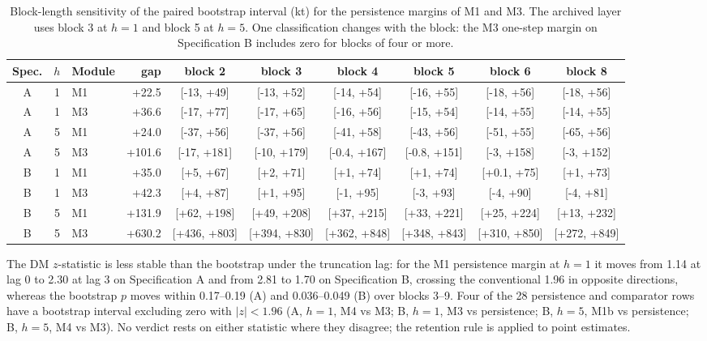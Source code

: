 \documentclass[preprint,11pt,authoryear]{elsarticle}
\theoremstyle{remark}
\begin{document}
\begin{table}[!htb]
\centering\scriptsize
\setlength{\tabcolsep}{2.6pt}
\caption{Block-length sensitivity of the paired bootstrap interval (kt) for the persistence margins of M1 and M3. The archived layer uses block 3 at $h=1$ and block 5 at $h=5$. One classification changes with the block: the M3 one-step margin on Specification B includes zero for blocks of four or more.}
\label{tab:si_blocks}
\begin{tabular}{@{}cclrcccccc@{}}
\toprule
Spec. & $h$ & Module & gap & block 2 & block 3 & block 4 & block 5 & block 6 & block 8 \\
\midrule
A & 1 & M1 & +22.5 & [-13, +49] & [-13, +52] & [-14, +54] & [-16, +55] & [-18, +56] & [-18, +56] \\
A & 1 & M3 & +36.6 & [-17, +77] & [-17, +65] & [-16, +56] & [-15, +54] & [-14, +55] & [-14, +55] \\
A & 5 & M1 & +24.0 & [-37, +56] & [-37, +56] & [-41, +58] & [-43, +56] & [-51, +55] & [-65, +56] \\
A & 5 & M3 & +101.6 & [-17, +181] & [-10, +179] & [-0.4, +167] & [-0.8, +151] & [-3, +158] & [-3, +152] \\
B & 1 & M1 & +35.0 & [+5, +67] & [+2, +71] & [+1, +74] & [+1, +74] & [+0.1, +75] & [+1, +73] \\
B & 1 & M3 & +42.3 & [+4, +87] & [+1, +95] & [-1, +95] & [-3, +93] & [-4, +90] & [-4, +81] \\
B & 5 & M1 & +131.9 & [+62, +198] & [+49, +208] & [+37, +215] & [+33, +221] & [+25, +224] & [+13, +232] \\
B & 5 & M3 & +630.2 & [+436, +803] & [+394, +830] & [+362, +848] & [+348, +843] & [+310, +850] & [+272, +849] \\
\bottomrule
\end{tabular}
\end{table}

The DM $z$-statistic is less stable than the bootstrap under the truncation lag: for the M1 persistence margin at $h=1$ it moves from 1.14 at lag 0 to 2.30 at lag 3 on Specification A and from 2.81 to 1.70 on Specification B, crossing the conventional 1.96 in opposite directions, whereas the bootstrap $p$ moves within 0.17--0.19 (A) and 0.036--0.049 (B) over blocks 3--9. Four of the 28 persistence and comparator rows have a bootstrap interval excluding zero with $|z|<1.96$ (A, $h=1$, M4 vs M3; B, $h=1$, M3 vs persistence; B, $h=5$, M1b vs persistence; B, $h=5$, M4 vs M3). No verdict rests on either statistic where they disagree; the retention rule is applied to point estimates.
\end{document}
